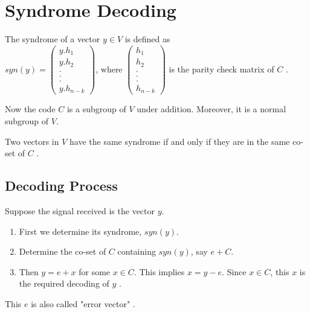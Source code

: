 \vspace{9mm}
\section{Syndrome Decoding}
\begin{definition}
  The syndrome of a vector \(y \in V\) is defined as \\ \(syn(y)=\begin{pmatrix}
    y.h_1\\
    y.h_2\\
    .\\
    .\\
    .\\
    y.h_{n-k}
  \end{pmatrix}\), \hspace{12mm} where \(\begin{pmatrix}
    h_1 \\ h_2\\ .\\ .\\ .\\ h_{n-k}
  \end{pmatrix}\) is the parity check matrix of \(C\) \cite{error_correct}.
\end{definition}
\vspace{3mm}
Now the code \(C\) is a subgroup of \(V\) under addition. Moreover, it is a normal subgroup of \(V\).
\begin{theorem}
  Two vectors in \(V\) have the same syndrome if and only if they are in the same co-set of \(C\) \cite{error_correct}.
\end{theorem}
\clearpage

\subsection{Decoding Process}
Suppose the signal received is the vector \(y\).
\begin{enumerate}
\item First we determine its syndrome, \(syn(y)\).
\item Determine the co-set of \(C\) containing \(syn(y)\), say \(e + C\).
\item Then \(y=e+x\) for some \(x \in C\). This implies \(x=y-e\). Since \(x \in C\), this \(x\) is the required decoding of \(y\) \cite{error_correct}.
\end{enumerate}
This \(e\) is also called "error vector" \cite{error_correct}.
\vspace{2mm}

